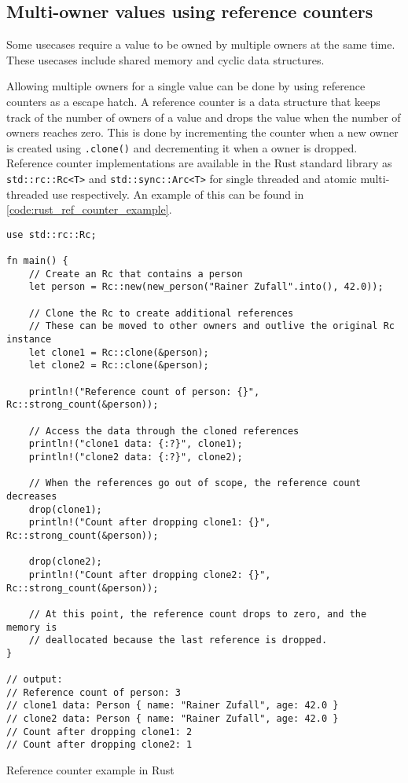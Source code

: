 
\subsection{Multi-owner values using reference counters}

Some usecases require a value to be owned by multiple owners at the same time.
These usecases include shared memory and cyclic data structures.

Allowing multiple owners for a single value can be done by using reference counters as a escape hatch.
A reference counter is a data structure that keeps track of the number of owners
of a value and drops the value when the number of owners reaches zero.
This is done by incrementing the counter when a new owner is created using \texttt{.clone()}
and decrementing it when a owner is dropped.
Reference counter implementations are available in the Rust standard library
as \texttt{std::rc::Rc<T>} \cite[320-323]{rust_book_2019} and \texttt{std::sync::Arc<T>} \cite[361]{rust_book_2019} for single threaded and atomic
multi-threaded use respectively.
An example of this can be found in \autoref{code:rust_ref_counter_example}.

\begin{listing}
    \begin{verbatim}
use std::rc::Rc;

fn main() {
    // Create an Rc that contains a person
    let person = Rc::new(new_person("Rainer Zufall".into(), 42.0));

    // Clone the Rc to create additional references
    // These can be moved to other owners and outlive the original Rc instance
    let clone1 = Rc::clone(&person);
    let clone2 = Rc::clone(&person);

    println!("Reference count of person: {}", Rc::strong_count(&person));

    // Access the data through the cloned references
    println!("clone1 data: {:?}", clone1);
    println!("clone2 data: {:?}", clone2);

    // When the references go out of scope, the reference count decreases
    drop(clone1);
    println!("Count after dropping clone1: {}", Rc::strong_count(&person));

    drop(clone2);
    println!("Count after dropping clone2: {}", Rc::strong_count(&person));

    // At this point, the reference count drops to zero, and the memory is
    // deallocated because the last reference is dropped.
}

// output:
// Reference count of person: 3
// clone1 data: Person { name: "Rainer Zufall", age: 42.0 }
// clone2 data: Person { name: "Rainer Zufall", age: 42.0 }
// Count after dropping clone1: 2
// Count after dropping clone2: 1
    \end{verbatim}
    \caption{Reference counter example in Rust}
    \label{code:rust_ref_counter_example}
\end{listing}

